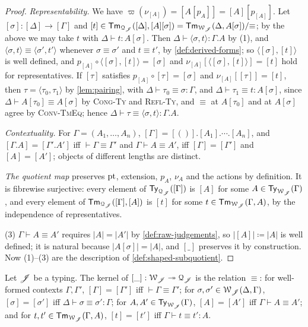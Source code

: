 \begin{proof}
    \emph{Representability.} We have $\varpi(\nu_{[A]}) = [A[p_A]] = [A][p_{[A]}]$. Let $[\sigma] : [\Delta] \to [\Gamma]$ and $[t] \in \mathsf{Tm}_{\mathcal{Q}_{\mathscr{J}}}([\Delta], [A][\sigma]) = \mathsf{Tm}_{\mathcal{W}_{\mathscr{J}}}(\Delta, A[\sigma])/{\equiv}$; by the above we may take $t$ with $\Delta \vdash t : A[\sigma]$. Then $\Delta \vdash \langle \sigma, t \rangle : \Gamma.A$ by (1), and $\langle \sigma, t \rangle \equiv \langle \sigma', t' \rangle$ whenever $\sigma \equiv \sigma'$ and $t \equiv t'$, by \cref{def:derived-forms}; so $\langle [\sigma], [t] \rangle$ is well defined, and $p_{[A]} \circ \langle [\sigma], [t] \rangle = [\sigma]$ and $\nu_{[A]}[\langle [\sigma], [t] \rangle] = [t]$ hold for representatives. If $[\tau]$ satisfies $p_{[A]} \circ [\tau] = [\sigma]$ and $\nu_{[A]}[[\tau]] = [t]$, then $\tau = \langle \tau_0, \tau_1 \rangle$ by \cref{lem:pairing}, with $\Delta \vdash \tau_0 \equiv \sigma : \Gamma$, and $\Delta \vdash \tau_1 \equiv t : A[\sigma]$, since $\Delta \vdash A[\tau_0] \equiv A[\sigma]$ by \textsc{Cong-Ty} and \textsc{Refl-Ty}, and $\equiv$ at $A[\tau_0]$ and at $A[\sigma]$ agree by \textsc{Conv-TmEq}; hence $\Delta \vdash \tau \equiv \langle \sigma, t \rangle : \Gamma.A$.

    \emph{Contextuality.} For $\Gamma = (A_1, \ldots, A_n)$, $[\Gamma] = [()].[A_1].\cdots.[A_n]$, and $[\Gamma.A] = [\Gamma'.A']$ iff $\vdash \Gamma \equiv \Gamma'$ and $\Gamma \vdash A \equiv A'$, iff $[\Gamma] = [\Gamma']$ and $[A] = [A']$; objects of different lengths are distinct.

    \emph{The quotient map} preserves $\mathrm{pt}$, extension, $p_A$, $\nu_A$ and the actions by definition. It is fibrewise surjective: every element of $\mathsf{Ty}_{\mathcal{Q}_{\mathscr{J}}}([\Gamma])$ is $[A]$ for some $A \in \mathsf{Ty}_{\mathcal{W}_{\mathscr{J}}}(\Gamma)$, and every element of $\mathsf{Tm}_{\mathcal{Q}_{\mathscr{J}}}([\Gamma], [A])$ is $[t]$ for some $t \in \mathsf{Tm}_{\mathcal{W}_{\mathscr{J}}}(\Gamma, A)$, by the independence of representatives.

    (3) $\Gamma \vdash A \equiv A'$ requires $|A| = |A'|$ by \cref{def:raw-judgements}, so $|[A]| \coloneqq |A|$ is well defined; it is natural because $|A[\sigma]| = |A|$, and $[\_]$ preserves it by construction. Now (1)--(3) are the description of \cref{def:shaped-subquotient}.
\end{proof}

\begin{proposition}\label{prop:span}
    Let $\mathscr{J}$ be a typing. The kernel of $[\_] : \mathcal{W}_{\mathscr{J}} \twoheadrightarrow \mathcal{Q}_{\mathscr{J}}$ is the relation $\equiv$: for well-formed contexts $\Gamma, \Gamma'$, $[\Gamma] = [\Gamma']$ iff $\vdash \Gamma \equiv \Gamma'$; for $\sigma, \sigma' \in \mathcal{W}_{\mathscr{J}}(\Delta, \Gamma)$, $[\sigma] = [\sigma']$ iff $\Delta \vdash \sigma \equiv \sigma' : \Gamma$; for $A, A' \in \mathsf{Ty}_{\mathcal{W}_{\mathscr{J}}}(\Gamma)$, $[A] = [A']$ iff $\Gamma \vdash A \equiv A'$; and for $t, t' \in \mathsf{Tm}_{\mathcal{W}_{\mathscr{J}}}(\Gamma, A)$, $[t] = [t']$ iff $\Gamma \vdash t \equiv t' : A$.
\end{proposition}

